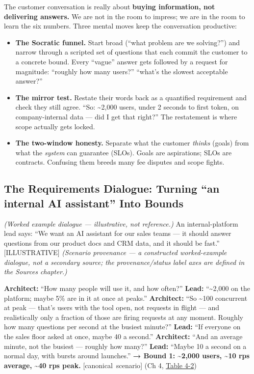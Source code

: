\label{mental-model}


The customer conversation is really about \textbf{buying information,
not delivering answers.} We are not in the room to impress; we are in
the room to learn the six numbers. Three mental moves keep the
conversation productive:

\begin{itemize}
\tightlist
\item
  \textbf{The Socratic funnel.} Start broad (``what problem are we
  solving?'') and narrow through a scripted set of questions that each
  commit the customer to a concrete bound. Every ``vague'' answer gets
  followed by a request for magnitude: ``roughly how many users?''
  ``what's the slowest acceptable answer?''
\item
  \textbf{The mirror test.} Restate their words back as a quantified
  requirement and check they still agree. ``So: \textasciitilde2,000
  users, under 2 seconds to first token, on company-internal data ---
  did I get that right?'' The restatement is where scope actually gets
  locked.
\item
  \textbf{The two-window honesty.} Separate what the customer
  \emph{thinks} (goals) from what the \emph{system} can guarantee
  (SLOs). Goals are aspirations; SLOs are contracts. Confusing them
  breeds many fee disputes and scope fights.
\end{itemize}

\label{worked-example}


\subsection{The Requirements Dialogue: Turning ``an internal AI
assistant'' Into
Bounds}\label{the-requirements-dialogue-turning-an-internal-ai-assistant-into-bounds}

\emph{(Worked example dialogue --- illustrative, not reference.)} An
internal-platform lead says: ``We want an AI assistant for our sales
teams --- it should answer questions from our product docs and CRM data,
and it should be fast.'' \mbox{{[}ILLUSTRATIVE{]}} \emph{(Scenario provenance
--- a constructed worked-example dialogue, not a secondary source; the
provenance/status label axes are defined in the Sources chapter.)}

\textbf{Architect:} ``How many people will use it, and how often?''
\textbf{Lead:} ``\textasciitilde2,000 on the platform; maybe 5\% are in
it at once at peaks.'' \textbf{Architect:} ``So \textasciitilde100
concurrent at peak --- that's users with the tool open, not requests in
flight --- and realistically only a fraction of those are firing
requests at any moment. Roughly how many questions per second at the
busiest minute?'' \textbf{Lead:} ``If everyone on the sales floor asked
at once, maybe 40 a second.'' \textbf{Architect:} ``And an average
minute, not the busiest --- roughly how many?'' \textbf{Lead:} ``Maybe
10 a second on a normal day, with bursts around launches.'' \textbf{→
Bound 1: \textasciitilde2,000 users, \textasciitilde10 rps average,
\textasciitilde40 rps peak.} \mbox{{[}canonical scenario{]}} (Ch 4, \hyperref[tab:4.2]{Table 4-2})

